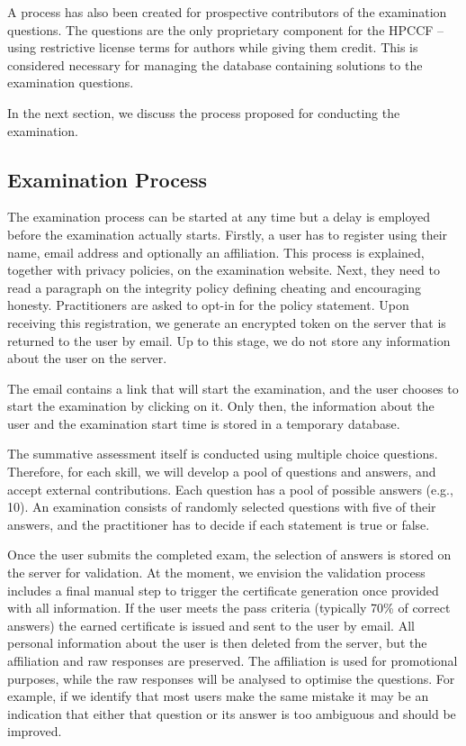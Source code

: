 \documentclass[jocse]{jocseart}
\begin{document}
A process has also been created for prospective contributors of the examination questions.
The questions are the only proprietary component for the HPCCF -- using restrictive license terms for authors while giving them credit.
This is considered necessary for managing the database containing solutions to the examination questions.

In the next section, we discuss the process proposed for conducting the examination.

\subsection{Examination Process}

The examination process can be started at any time but a delay is employed before the examination actually starts.
Firstly, a user has to register using their name, email address and optionally an affiliation.
This process is explained, together with privacy policies, on the examination website.
Next, they need to read a paragraph on the integrity policy defining cheating and encouraging honesty.
Practitioners are asked to opt-in for the policy statement.
Upon receiving this registration, we generate an encrypted token on the server that is returned to the user by email.
Up to this stage, we do not store any information about the user on the server.

The email contains a link that will start the examination, and the user chooses to start the examination by clicking on it.
Only then, the information about the user and the examination start time is stored in a temporary database.

The summative assessment itself is conducted using multiple choice questions.
Therefore, for each skill, we will develop a pool of questions and answers, and accept external contributions.
Each question has a pool of possible answers (e.g., 10).
An examination consists of randomly selected questions with five of their answers, and the practitioner has to decide if each statement is true or false.

Once the user submits the completed exam, the selection of answers is stored on the server for validation.
At the moment, we envision the validation process includes a final manual step to trigger the certificate generation once provided with all information.
If the user meets the pass criteria (typically 70\% of correct answers) the earned certificate is issued and sent to the user by email.
All personal information about the user is then deleted from the server, but the affiliation and raw responses are preserved.
The affiliation is used for promotional purposes, while the raw responses will be analysed to optimise the questions.
For example, if we identify that most users make the same mistake it may be an indication that either that question or its answer is too ambiguous and should be improved.
\end{document}
